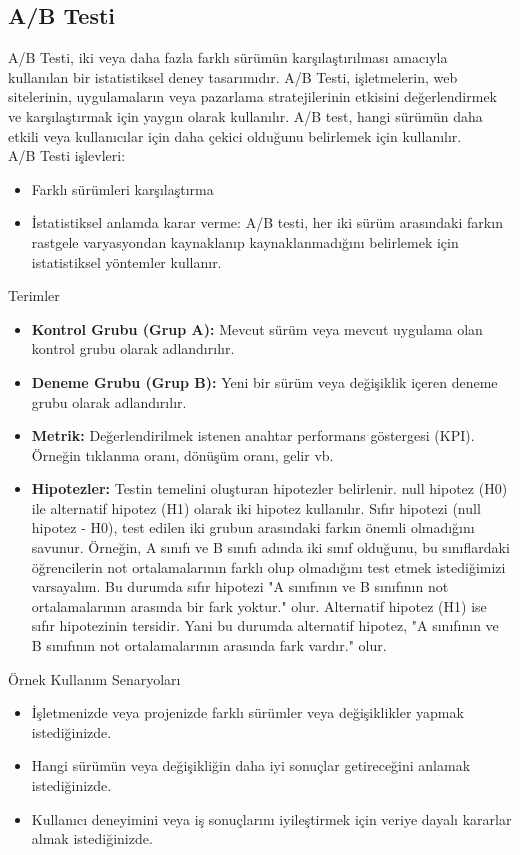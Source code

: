 \subsection{A/B Testi}
A/B Testi, iki veya daha fazla farklı sürümün karşılaştırılması amacıyla kullanılan bir istatistiksel deney tasarımıdır. A/B Testi, işletmelerin, web sitelerinin, uygulamaların veya pazarlama stratejilerinin etkisini değerlendirmek ve karşılaştırmak için yaygın olarak kullanılır. A/B test, hangi sürümün daha etkili veya kullanıcılar için daha çekici olduğunu belirlemek için kullanılır.\\
A/B Testi işlevleri:
\begin{itemize}
    \item Farklı sürümleri karşılaştırma
    \item İstatistiksel anlamda karar verme: A/B testi, her iki sürüm arasındaki farkın rastgele varyasyondan kaynaklanıp kaynaklanmadığını belirlemek için istatistiksel yöntemler kullanır.
\end{itemize}

Terimler
\begin{itemize}
    \item \textbf{Kontrol Grubu (Grup A):} Mevcut sürüm veya mevcut uygulama olan kontrol grubu olarak adlandırılır.
    \item \textbf{Deneme Grubu (Grup B):} Yeni bir sürüm veya değişiklik içeren deneme grubu olarak adlandırılır.
    \item \textbf{Metrik:} Değerlendirilmek istenen anahtar performans göstergesi (KPI). Örneğin tıklanma oranı, dönüşüm oranı, gelir vb.
    \item \textbf{Hipotezler:} Testin temelini oluşturan hipotezler belirlenir. null hipotez (H0) ile alternatif hipotez (H1) olarak iki hipotez kullanılır. Sıfır hipotezi (null hipotez - H0), test edilen iki grubun arasındaki farkın önemli olmadığını savunur. Örneğin, A sınıfı ve B sınıfı adında iki sınıf olduğunu, bu sınıflardaki öğrencilerin not ortalamalarının farklı olup olmadığını test etmek istediğimizi varsayalım. Bu durumda sıfır hipotezi "A sınıfının ve B sınıfının not ortalamalarının arasında bir fark yoktur." olur. Alternatif hipotez (H1) ise sıfır hipotezinin tersidir. Yani bu durumda alternatif hipotez, "A sınıfının ve B sınıfının not ortalamalarının arasında fark vardır." olur.
\end{itemize}

Örnek Kullanım Senaryoları
\begin{itemize}
    \item İşletmenizde veya projenizde farklı sürümler veya değişiklikler yapmak istediğinizde.
    \item Hangi sürümün veya değişikliğin daha iyi sonuçlar getireceğini anlamak istediğinizde.
    \item Kullanıcı deneyimini veya iş sonuçlarını iyileştirmek için veriye dayalı kararlar almak istediğinizde.
\end{itemize}

